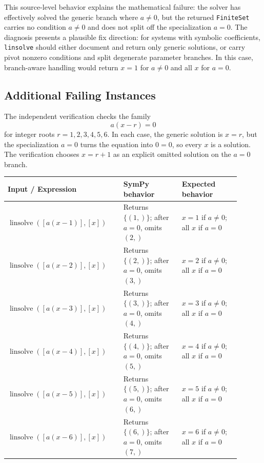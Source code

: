 \documentclass[11pt]{article}
\begin{document}
This source-level behavior explains the mathematical failure: the solver has
effectively solved the generic branch where \(a\ne 0\), but the returned
\texttt{FiniteSet} carries no condition \(a\ne 0\) and does not split off the
specialization \(a=0\).  The diagnosis presents a plausible fix direction:
for systems with symbolic coefficients, \texttt{linsolve} should either
document and return only generic solutions, or carry pivot nonzero conditions
and split degenerate parameter branches.  In this case, branch-aware handling
would return \(x=1\) for \(a\ne 0\) and all \(x\) for \(a=0\).

\subsection{Additional Failing Instances}

The independent verification checks the family
\[
  a(x-r)=0
\]
for integer roots \(r=1,2,3,4,5,6\).  In each case, the generic solution is
\(x=r\), but the specialization \(a=0\) turns the equation into \(0=0\), so
every \(x\) is a solution.  The verification chooses \(x=r+1\) as an explicit
omitted solution on the \(a=0\) branch.

\begin{center}
\renewcommand{\arraystretch}{1.3}
\begin{tabular}{@{}>{\raggedright\arraybackslash}p{0.44\linewidth}>{\raggedright\arraybackslash}p{0.23\linewidth}>{\raggedright\arraybackslash}p{0.23\linewidth}@{}}
\toprule
\textbf{Input / Expression} & \textbf{SymPy behavior} & \textbf{Expected behavior} \\
\midrule
\(\operatorname{linsolve}([a(x-1)],[x])\) & Returns \(\{(1,)\}\); after \(a=0\), omits \((2,)\) & \(x=1\) if \(a\ne 0\); all \(x\) if \(a=0\) \\
\(\operatorname{linsolve}([a(x-2)],[x])\) & Returns \(\{(2,)\}\); after \(a=0\), omits \((3,)\) & \(x=2\) if \(a\ne 0\); all \(x\) if \(a=0\) \\
\(\operatorname{linsolve}([a(x-3)],[x])\) & Returns \(\{(3,)\}\); after \(a=0\), omits \((4,)\) & \(x=3\) if \(a\ne 0\); all \(x\) if \(a=0\) \\
\(\operatorname{linsolve}([a(x-4)],[x])\) & Returns \(\{(4,)\}\); after \(a=0\), omits \((5,)\) & \(x=4\) if \(a\ne 0\); all \(x\) if \(a=0\) \\
\(\operatorname{linsolve}([a(x-5)],[x])\) & Returns \(\{(5,)\}\); after \(a=0\), omits \((6,)\) & \(x=5\) if \(a\ne 0\); all \(x\) if \(a=0\) \\
\(\operatorname{linsolve}([a(x-6)],[x])\) & Returns \(\{(6,)\}\); after \(a=0\), omits \((7,)\) & \(x=6\) if \(a\ne 0\); all \(x\) if \(a=0\) \\
\bottomrule
\end{tabular}
\end{center}
\end{document}

